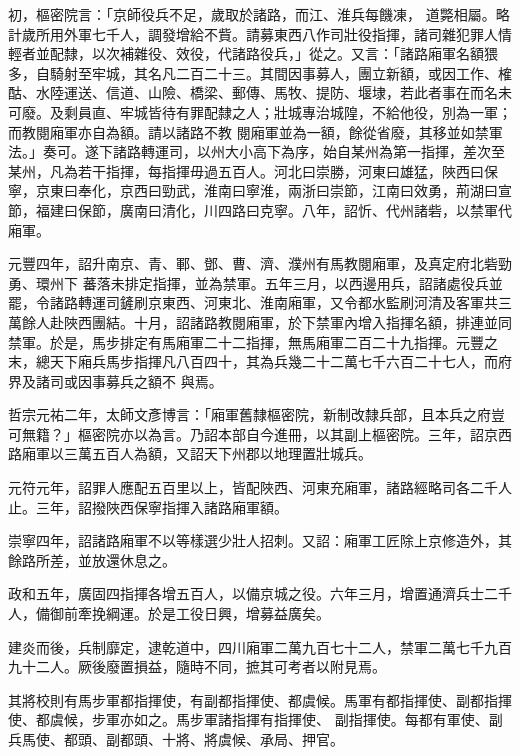 \begin{pinyinscope}
 初，樞密院言：「京師役兵不足，歲取於諸路，而江、淮兵每饑凍，
 道斃相屬。略計歲所用外軍七千人，調發增給不貲。請募東西八作司壯役指揮，諸司雜犯罪人情輕者並配隸，以次補雜役、效役，代諸路役兵，」從之。又言：「諸路廂軍名額猥多，自騎射至牢城，其名凡二百二十三。其間因事募人，團立新額，或因工作、榷酤、水陸運送、信道、山險、橋梁、郵傳、馬牧、提防、堰埭，若此者事在而名未可廢。及剩員直、牢城皆待有罪配隸之人；壯城專治城隍，不給他役，別為一軍；而教閱廂軍亦自為額。請以諸路不教
 閱廂軍並為一額，餘從省廢，其移並如禁軍法。」奏可。遂下諸路轉運司，以州大小高下為序，始自某州為第一指揮，差次至某州，凡為若干指揮，每指揮毋過五百人。河北曰崇勝，河東曰雄猛，陜西曰保寧，京東曰奉化，京西曰勁武，淮南曰寧淮，兩浙曰崇節，江南曰效勇，荊湖曰宣節，福建曰保節，廣南曰清化，川四路曰克寧。八年，詔忻、代州諸砦，以禁軍代廂軍。



 元豐四年，詔升南京、青、鄆、鄧、曹、濟、濮州有馬教閱廂軍，及真定府北砦勁勇、環州下
 蕃落未排定指揮，並為禁軍。五年三月，以西邊用兵，詔諸處役兵並罷，令諸路轉運司鏟刷京東西、河東北、淮南廂軍，又令都水監刷河清及客軍共三萬餘人赴陜西團結。十月，詔諸路教閱廂軍，於下禁軍內增入指揮名額，排連並同禁軍。於是，馬步排定有馬廂軍二十二指揮，無馬廂軍二百二十九指揮。元豐之末，總天下廂兵馬步指揮凡八百四十，其為兵幾二十二萬七千六百二十七人，而府界及諸司或因事募兵之額不
 與焉。



 哲宗元祐二年，太師文彥博言：「廂軍舊隸樞密院，新制改隸兵部，且本兵之府豈可無籍？」樞密院亦以為言。乃詔本部自今進冊，以其副上樞密院。三年，詔京西路廂軍以三萬五百人為額，又詔天下州郡以地理置壯城兵。



 元符元年，詔罪人應配五百里以上，皆配陜西、河東充廂軍，諸路經略司各二千人止。三年，詔撥陜西保寧指揮入諸路廂軍額。



 崇寧四年，詔諸路廂軍不以等樣選少壯人招刺。又詔：廂軍工匠除上京修造外，其
 餘路所差，並放還休息之。



 政和五年，廣固四指揮各增五百人，以備京城之役。六年三月，增置通濟兵士二千人，備御前牽挽綱運。於是工役日興，增募益廣矣。



 建炎而後，兵制靡定，逮乾道中，四川廂軍二萬九百七十二人，禁軍二萬七千九百九十二人。厥後廢置損益，隨時不同，摭其可考者以附見焉。



 其將校則有馬步軍都指揮使，有副都指揮使、都虞候。馬軍有都指揮使、副都指揮使、都虞候，步軍亦如之。馬步軍諸指揮有指揮使、
 副指揮使。每都有軍使、副兵馬使、都頭、副都頭、十將、將虞候、承局、押官。




\end{pinyinscope}
